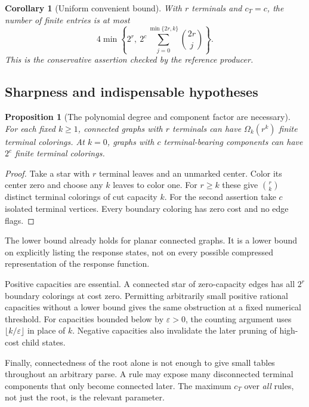 \documentclass[11pt,a4paper]{article}
\newtheorem{proposition}[theorem]{Proposition}
\newtheorem{corollary}[theorem]{Corollary}
\theoremstyle{definition}
\theoremstyle{remark}
\newcommand{\bk}[2]{\sum_{j=0}^{\min\{#1,#2\}}\binom{#1}{j}}
\begin{document}
\begin{corollary}[Uniform convenient bound]
With $r$ terminals and $c_T=c$, the number of finite entries is at most
\[
 4\min\left\{2^r,\ 2^c\bk{2r}{k}\right\}.
\]
This is the conservative assertion checked by the reference producer.
\end{corollary}

\subsection{Sharpness and indispensable hypotheses}
\begin{proposition}[The polynomial degree and component factor are necessary]
\label{prop:sharp}
For each fixed $k\ge1$, connected graphs with $r$ terminals can have $\Omega_k(r^k)$ finite terminal colorings. At $k=0$, graphs with $c$ terminal-bearing components can have $2^c$ finite terminal colorings.
\end{proposition}
\begin{proof}
Take a star with $r$ terminal leaves and an unmarked center. Color its center zero and choose any $k$ leaves to color one. For $r\ge k$ these give $\binom rk$ distinct terminal colorings of cut capacity $k$. For the second assertion take $c$ isolated terminal vertices. Every boundary coloring has zero cost and no edge flags.
\end{proof}
The lower bound already holds for planar connected graphs. It is a lower bound on explicitly listing the response states, not on every possible compressed representation of the response function.

Positive capacities are essential. A connected star of zero-capacity edges has all $2^r$ boundary colorings at cost zero. Permitting arbitrarily small positive rational capacities without a lower bound gives the same obstruction at a fixed numerical threshold. For capacities bounded below by $\varepsilon>0$, the counting argument uses $\lfloor k/\varepsilon\rfloor$ in place of $k$. Negative capacities also invalidate the later pruning of high-cost child states.

Finally, connectedness of the root alone is not enough to give small tables throughout an arbitrary parse. A rule may expose many disconnected terminal components that only become connected later. The maximum $c_T$ over \emph{all} rules, not just the root, is the relevant parameter.
\end{document}
